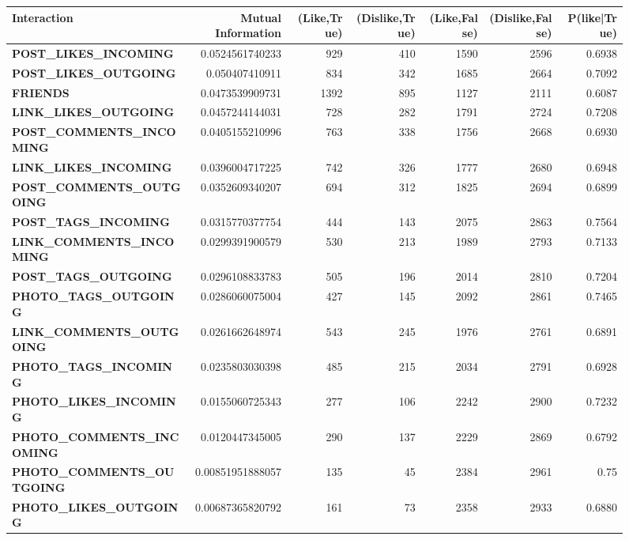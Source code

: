 \documentclass[letterpaper]{article}
\begin{document}
\begin{figure}
\begin{table}
	\centering
	\begin{tabular}{| >{\small}l | >{\small}r | >{\small}r | >{\small}r | >{\small}r | >{\small}r | >{\small}r |}
	\hline
	Interaction & Mutual Information & (Like,True) & (Dislike,True) & (Like,False) & (Dislike,False)& P(like|True)\\
	\hline
	\textbf{POST\_LIKES\_INCOMING} & 0.0524561740233 & 929 & 410 & 1590 & 2596 & 0.6938\\
	\hline
	\textbf{POST\_LIKES\_OUTGOING}& 0.050407410911 & 834 & 342 & 1685 & 2664 & 0.7092\\
	\hline
	\textbf{FRIENDS} & 0.0473539909731 & 1392 & 895 & 1127 & 2111 & 0.6087\\
	\hline
	\textbf{LINK\_LIKES\_OUTGOING}& 0.0457244144031 & 728 & 282 & 1791 & 2724 & 0.7208\\
	\hline
	\textbf{POST\_COMMENTS\_INCOMING}& 0.0405155210996 & 763 & 338 & 1756 & 2668& 0.6930\\
	\hline
	\textbf{LINK\_LIKES\_INCOMING}& 0.0396004717225 & 742 & 326 & 1777 & 2680 & 0.6948\\
	\hline
	\textbf{POST\_COMMENTS\_OUTGOING}& 0.0352609340207 & 694 & 312 & 1825 & 2694 & 0.6899\\
	\hline
	\textbf{POST\_TAGS\_INCOMING}& 0.0315770377754 & 444 & 143 & 2075 & 2863 & 0.7564\\
	\hline
	\textbf{LINK\_COMMENTS\_INCOMING}& 0.0299391900579 & 530 & 213 & 1989 & 2793 & 0.7133 \\
	\hline
	\textbf{POST\_TAGS\_OUTGOING}& 0.0296108833783 & 505 & 196 & 2014 & 2810 & 0.7204\\
	\hline
	\textbf{PHOTO\_TAGS\_OUTGOING}& 0.0286060075004 & 427 & 145 & 2092 & 2861 & 0.7465\\
	\hline
	\textbf{LINK\_COMMENTS\_OUTGOING}& 0.0261662648974 & 543 & 245 & 1976 & 2761 & 0.6891\\
	\hline
	\textbf{PHOTO\_TAGS\_INCOMING}& 0.0235803030398 & 485 & 215 & 2034 & 2791 & 0.6928\\
	\hline
	\textbf{PHOTO\_LIKES\_INCOMING}& 0.0155060725343 & 277 & 106 & 2242 & 2900 & 0.7232\\
	\hline
	\textbf{PHOTO\_COMMENTS\_INCOMING}& 0.0120447345005 & 290 & 137 & 2229 & 2869 & 0.6792\\
	\hline
	\textbf{PHOTO\_COMMENTS\_OUTGOING}& 0.00851951888057 & 135 & 45 & 2384 & 2961& 0.75\\
	\hline
	\textbf{PHOTO\_LIKES\_OUTGOING}& 0.00687365820792 & 161 & 73 & 2358 & 2933 & 0.6880\\

\end{tabular}
\end{table}
\end{figure}
\end{document}
